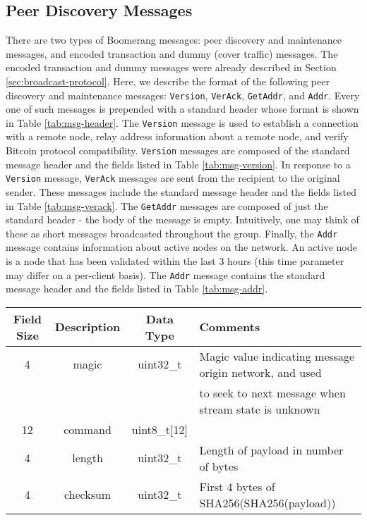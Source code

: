 \subsection{Peer Discovery Messages}
There are two types of Boomerang messages: peer discovery and maintenance messages, and encoded transaction and dummy (cover traffic) messages. The encoded transaction and dummy messages were already described in Section \ref{sec:broadcast-protocol}. Here, we describe the format of the following peer discovery and maintenance messages: {\tt Version}, {\tt VerAck}, {\tt GetAddr}, and {\tt Addr}. Every one of such messages is prepended with a standard header whose format is shown in Table \ref{tab:msg-header}. The {\tt Version} message is used to establish a connection with a remote node, relay address information about a remote node, and verify Bitcoin protocol compatibility. {\tt Version} messages are composed of the standard message header and the fields listed in Table \ref{tab:msg-version}. In response to a {\tt Version} message, {\tt VerAck} messages are sent from the recipient to the original sender. These messages include the standard message header and the fields listed in Table \ref{tab:msg-verack}. The {\tt GetAddr} messages are composed of just the standard header - the body of the message is empty. Intuitively, one may think of these as short messages broadcasted throughout the group. Finally, the {\tt Addr} message contains information about active nodes on the network. An active node is a node that has been validated within the last 3 hours (this time parameter may differ on a per-client basis). The {\tt Addr} message contains the standard message header and the fields listed in Table \ref{tab:msg-addr}. 

\begin{table*}
\begin{center}
\caption{Message header format.}
\label{tab:msg-header}
    \begin{tabular}{|c|c|c|l|} \hline
    \textbf{Field Size} & {\bf Description} & {\bf Data Type} & {\bf Comments} \\ \hline
    4 & magic & uint32\_t & Magic value indicating message origin network, and used \\
    ~ & ~ & ~ & to seek to next message when stream state is unknown \\
    12 & command & uint8\_t[12] & ~ \\
    4 & length & uint32\_t & Length of payload in number of bytes \\
    4 & checksum & uint32\_t & First 4 bytes of SHA256(SHA256(payload)) \\ \hline
    \end{tabular}
\end{center}
\end{table*}

